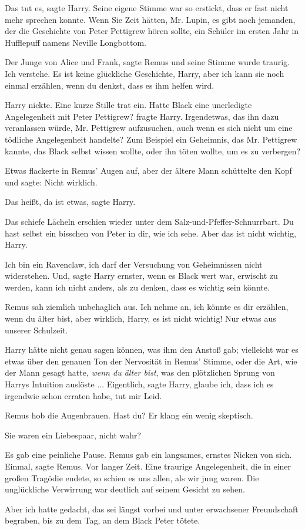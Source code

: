 \glqq{}Das tut es\grqq{}, sagte Harry. Seine eigene Stimme war so erstickt, dass
er fast nicht mehr sprechen konnte. \glqq{}Wenn Sie Zeit hätten, Mr. Lupin, es
gibt noch jemanden, der die Geschichte von Peter Pettigrew hören sollte, ein
Schüler im ersten Jahr in Hufflepuff namens Neville Longbottom.\grqq{}

\glqq{}Der Junge von Alice und Frank\grqq{}, sagte Remus und seine Stimme wurde
traurig. \glqq{}Ich verstehe. Es ist keine glückliche Geschichte, Harry, aber ich
kann sie noch einmal erzählen, wenn du denkst, dass es ihm helfen wird.\grqq{}

Harry nickte. Eine kurze Stille trat ein. \glqq{}Hatte Black eine unerledigte
Angelegenheit mit Peter Pettigrew?\grqq{} fragte Harry. \glqq{}Irgendetwas, das
ihn dazu veranlassen würde, Mr. Pettigrew aufzusuchen, auch wenn es sich nicht
um eine tödliche Angelegenheit handelte? Zum Beispiel ein Geheimnis, das Mr.
Pettigrew kannte, das Black selbst wissen wollte, oder ihn töten wollte, um es
zu verbergen?\grqq{}

Etwas flackerte in Remus' Augen auf, aber der ältere Mann schüttelte den Kopf
und sagte: \glqq{}Nicht wirklich.\grqq{}

\glqq{}Das heißt, da ist etwas\grqq{}, sagte Harry.

Das schiefe Lächeln erschien wieder unter dem Salz-und-Pfeffer-Schnurrbart.
\glqq{}Du hast selbst ein bisschen von Peter in dir, wie ich sehe. Aber das ist
nicht wichtig, Harry.\grqq{}

\glqq{}Ich bin ein Ravenclaw, ich darf der Versuchung von Geheimnissen nicht
widerstehen. Und\grqq{}, sagte Harry ernster, \glqq{}wenn es Black wert war,
erwischt zu werden, kann ich nicht anders, als zu denken, dass es wichtig sein
könnte.\grqq{}

Remus sah ziemlich unbehaglich aus. \glqq{}Ich nehme an, ich könnte es dir
erzählen, wenn du älter bist, aber wirklich, Harry, es ist nicht wichtig! Nur
etwas aus unserer Schulzeit.\grqq{}

Harry hätte nicht genau sagen können, was ihm den Anstoß gab; vielleicht war es
etwas über den genauen Ton der Nervosität in Remus' Stimme, oder die Art, wie
der Mann gesagt hatte, \emph{wenn du älter bist}, was den plötzlichen Sprung von
Harrys Intuition auslöste ... \glqq{}Eigentlich\grqq{}, sagte Harry, \glqq{}glaube
ich, dass ich es irgendwie schon erraten habe, tut mir Leid.\grqq{}

Remus hob die Augenbrauen. \glqq{}Hast du?\grqq{} Er klang ein wenig skeptisch.

\glqq{}Sie waren ein Liebespaar, nicht wahr?\grqq{}

Es gab eine peinliche Pause. Remus gab ein langsames, ernstes Nicken von sich.
\glqq{}Einmal\grqq{}, sagte Remus. \glqq{}Vor langer Zeit. Eine traurige
Angelegenheit, die in einer großen Tragödie endete, so schien es uns allen, als
wir jung waren.\grqq{} Die unglückliche Verwirrung war deutlich auf seinem Gesicht zu
sehen.

\glqq{}Aber ich hatte gedacht, das sei längst vorbei und unter erwachsener
Freundschaft begraben, bis zu dem Tag, an dem Black Peter tötete.\grqq{}

